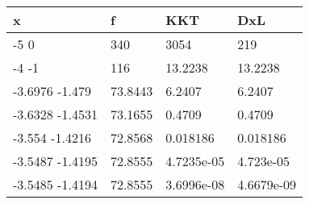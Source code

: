 \begin{tabular}{llll}
x & f & KKT & DxL \\ 
\hline 
-5  0 & 340 & 3054 & 219 \\ 
-4          -1 & 116 & 13.2238 & 13.2238 \\ 
-3.6976      -1.479 & 73.8443 & 6.2407 & 6.2407 \\ 
-3.6328     -1.4531 & 73.1655 & 0.4709 & 0.4709 \\ 
-3.554     -1.4216 & 72.8568 & 0.018186 & 0.018186 \\ 
-3.5487     -1.4195 & 72.8555 & 4.7235e-05 & 4.723e-05 \\ 
-3.5485     -1.4194 & 72.8555 & 3.6996e-08 & 4.6679e-09 \\ 
\hline 
\end{tabular}